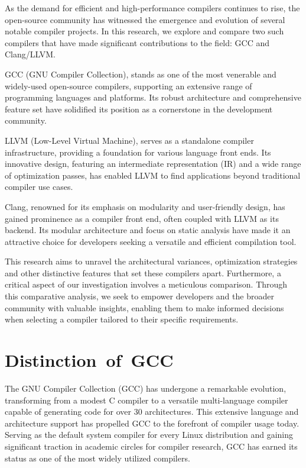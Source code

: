 \documentclass[conference]{IEEEtran}
\begin{document}
As the demand for efficient and high-performance compilers continues to rise, the open-source community has witnessed the emergence and evolution of several notable compiler projects. In this research, we explore and compare two such compilers that have made significant contributions to the field: GCC and Clang/LLVM.

GCC (GNU Compiler Collection), stands as one of the most venerable and widely-used open-source compilers, supporting an extensive range of programming languages and platforms. Its robust architecture and comprehensive feature set have solidified its position as a cornerstone in the development community.

LLVM (Low-Level Virtual Machine), serves as a standalone compiler infrastructure, providing a foundation for various language front ends. Its innovative design, featuring an intermediate representation (IR) and a wide range of optimization passes, has enabled LLVM to find applications beyond traditional compiler use cases.

Clang, renowned for its emphasis on modularity and user-friendly design, has gained prominence as a compiler front end, often coupled with LLVM as its backend. Its modular architecture and focus on static analysis have made it an attractive choice for developers seeking a versatile and efficient compilation tool.

This research aims to unravel the architectural variances, optimization strategies and other distinctive features that set these compilers apart. Furthermore, a critical aspect of our investigation involves a meticulous comparison. Through this comparative analysis, we seek to empower developers and the broader community with valuable insights, enabling them to make informed decisions when selecting a compiler tailored to their specific requirements.

\section{Distinction of GCC}
The GNU Compiler Collection (GCC) has undergone a remarkable evolution, transforming from a modest C compiler to a versatile multi-language compiler capable of generating code for over 30 architectures. This extensive language and architecture support has propelled GCC to the forefront of compiler usage today. Serving as the default system compiler for every Linux distribution and gaining significant traction in academic circles for compiler research, GCC has earned its status as one of the most widely utilized compilers.
\end{document}
